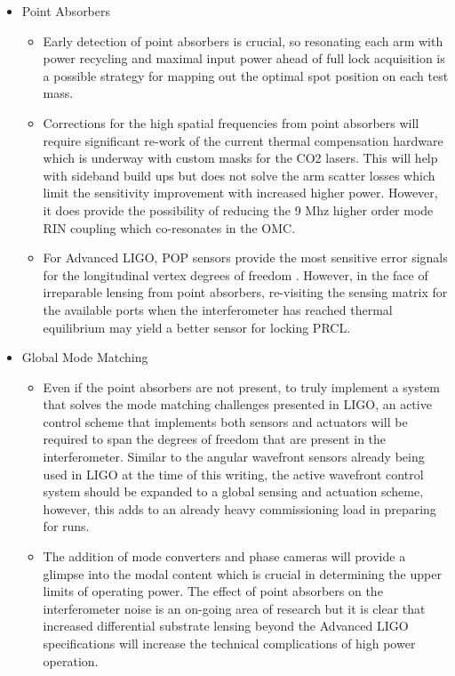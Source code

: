 \begin{itemize}
	\item Point Absorbers
	\begin{itemize}
		\item Early detection of point absorbers is crucial, so resonating each arm with power recycling and maximal input power ahead of full lock acquisition is a possible strategy for mapping out the optimal spot position on each test mass.
		\item Corrections for the high spatial frequencies from point absorbers will require significant re-work of the current thermal compensation hardware which is underway with custom masks for the CO2 lasers. This will help with sideband build ups but does not solve the arm scatter losses which limit the sensitivity improvement with increased higher power.  However, it does provide the possibility of reducing the 9 Mhz higher order mode RIN coupling which co-resonates in the OMC.
		\item For Advanced LIGO, POP sensors provide the most sensitive error signals for the longitudinal vertex degrees of freedom \cite{kiwamu_freq1}\cite{kiwamu_freq2}\cite{kiwamu_freq3}. However, in the face of irreparable lensing from point absorbers, re-visiting the sensing matrix for the available ports when the interferometer has reached thermal equilibrium may yield a better sensor for locking PRCL.
	\end{itemize}
	\item Global Mode Matching
	\begin{itemize}		
		\item Even if the point absorbers are not present, to truly implement a system that solves the mode matching challenges presented in LIGO, an active control scheme that implements both sensors and actuators will be required to span the degrees of freedom that are present in the interferometer.  Similar to the angular wavefront sensors already being used in LIGO at the time of this writing, the active wavefront control system should be expanded to a global sensing and actuation scheme, however, this adds to an already heavy commissioning load in preparing for runs.
		\item The addition of mode converters and phase cameras will provide a glimpse into the modal content which is crucial in determining the upper limits of operating power. The effect of point absorbers on the interferometer noise is an on-going area of research but it is clear that increased differential substrate lensing beyond the Advanced LIGO specifications will increase the technical complications of high power operation. 

\end{itemize}
\end{itemize}
